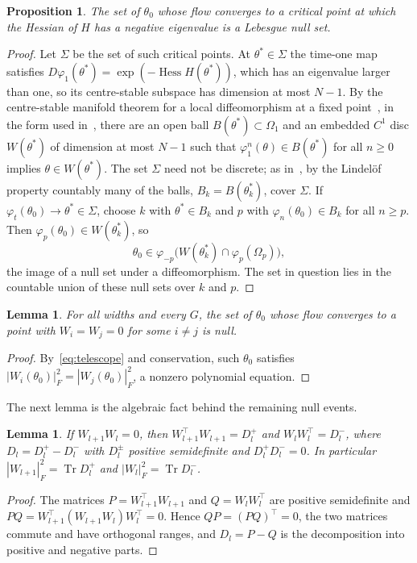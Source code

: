 \documentclass[11pt]{amsart}
\newtheorem{lemma}[theorem]{Lemma}
\newtheorem{proposition}[theorem]{Proposition}
\theoremstyle{definition}
\theoremstyle{remark}
\numberwithin{equation}{section}
\DeclareMathOperator{\Hess}{Hess}
\DeclareMathOperator{\Tr}{Tr}
\begin{document}
\begin{proposition}\label{prop:strict}
The set of $\theta_0$ whose flow converges to a critical point at which the Hessian of $H$ has a negative eigenvalue is a Lebesgue null set.
\end{proposition}
\begin{proof}
Let $\Sigma$ be the set of such critical points. At $\theta^*\in\Sigma$ the time-one map satisfies $D\varphi_1(\theta^*)=\exp(-\Hess H(\theta^*))$, which has an eigenvalue larger than one, so its centre-stable subspace has dimension at most $N-1$. By the centre-stable manifold theorem for a local diffeomorphism at a fixed point~\cite[Theorem~III.7]{Shub}, in the form used in~\cite[proof of Theorem~2]{LPPSJR}, there are an open ball $B(\theta^*)\subset\Omega_1$ and an embedded $C^1$ disc $W(\theta^*)$ of dimension at most $N-1$ such that $\varphi_1^n(\theta)\in B(\theta^*)$ for all $n\ge0$ implies $\theta\in W(\theta^*)$. The set $\Sigma$ need not be discrete; as in~\cite{PP}, by the Lindel\"of property countably many of the balls, $B_k=B(\theta_k^*)$, cover $\Sigma$. If $\varphi_t(\theta_0)\to\theta^*\in\Sigma$, choose $k$ with $\theta^*\in B_k$ and $p$ with $\varphi_n(\theta_0)\in B_k$ for all $n\ge p$. Then $\varphi_p(\theta_0)\in W(\theta_k^*)$, so
\[
\theta_0\in\varphi_{-p}\bigl(W(\theta_k^*)\cap\varphi_p(\Omega_p)\bigr),
\]
the image of a null set under a diffeomorphism. The set in question lies in the countable union of these null sets over $k$ and $p$.
\end{proof}

\begin{lemma}\label{lem:twozero}
For all widths and every $G$, the set of $\theta_0$ whose flow converges to a point with $W_i=W_j=0$ for some $i\ne j$ is null.
\end{lemma}
\begin{proof}
By~\eqref{eq:telescope} and conservation, such $\theta_0$ satisfies $|W_i(\theta_0)|_F^2=|W_j(\theta_0)|_F^2$, a nonzero polynomial equation.
\end{proof}

The next lemma is the algebraic fact behind the remaining null events.

\begin{lemma}\label{lem:split}
If $W_{l+1}W_l=0$, then $W_{l+1}^\top W_{l+1}=D_l^+$ and $W_lW_l^\top=D_l^-$, where $D_l=D_l^+-D_l^-$ with $D_l^\pm$ positive semidefinite and $D_l^+D_l^-=0$. In particular $|W_{l+1}|_F^2=\Tr D_l^+$ and $|W_l|_F^2=\Tr D_l^-$.
\end{lemma}
\begin{proof}
The matrices $P=W_{l+1}^\top W_{l+1}$ and $Q=W_lW_l^\top$ are positive semidefinite and $PQ=W_{l+1}^\top(W_{l+1}W_l)W_l^\top=0$. Hence $QP=(PQ)^\top=0$, the two matrices commute and have orthogonal ranges, and $D_l=P-Q$ is the decomposition into positive and negative parts.
\end{proof}
\end{document}
